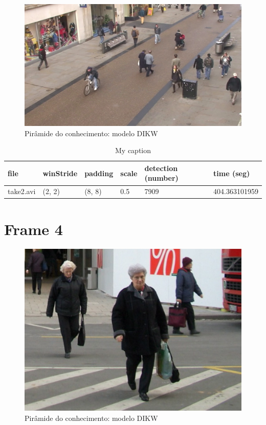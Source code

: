\begin{figure}[!htb]
	\centering
	\includegraphics[scale=0.25]{img/vision/frame3.png}
	\caption{Pirâmide do conhecimento: modelo DIKW}
	\label{db}
\end{figure}



\begin{table}[h]
	\centering
	\begin{tabular}{|l|l|l|l|l|l|}
		\hline
		\textbf{file} & \textbf{winStride} & \textbf{padding} & \textbf{scale} & \textbf{detection (number)} & \textbf{time (seg)} \\ \hline
		take2.avi & (2, 2) & (8, 8) & 0.5 & 7909 & 404.363101959 \\ \hline
		
		
	\end{tabular}
	\caption{My caption}
	\label{my-label}
\end{table}

\section{Frame 4}




\begin{figure}[!htb]
	\centering
	\includegraphics[scale=0.25]{img/vision/frame4.jpg}
	\caption{Pirâmide do conhecimento: modelo DIKW}
	\label{db}
\end{figure}


